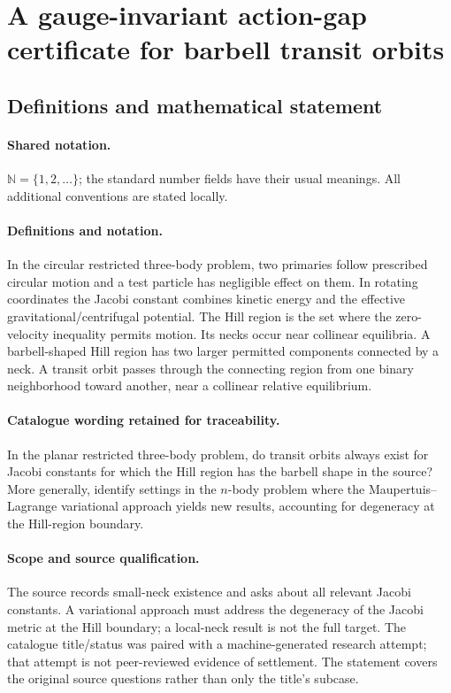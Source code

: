 \documentclass[11pt]{article}
\begin{document}
\section{A gauge-invariant action-gap certificate for barbell transit orbits}\label{statement}

\subsection{Definitions and mathematical statement}

\paragraph{Shared notation.}$\mathbb N=\{1,2,\ldots\}$; the standard number fields have their usual meanings. All additional conventions are stated locally.


\paragraph{Definitions and notation.}In the circular restricted three-body problem, two primaries follow prescribed circular motion and a test particle has negligible effect on them. In rotating coordinates the Jacobi constant combines kinetic energy and the effective gravitational/centrifugal potential. The Hill region is the set where the zero-velocity inequality permits motion. Its necks occur near collinear equilibria. A barbell-shaped Hill region has two larger permitted components connected by a neck. A transit orbit passes through the connecting region from one binary neighborhood toward another, near a collinear relative equilibrium.

\paragraph{Catalogue wording retained for traceability.}
In the planar restricted three-body problem, do transit orbits always exist for Jacobi constants for which the Hill region has the barbell shape in the source? More generally, identify settings in the $n$-body problem where the Maupertuis--Lagrange variational approach yields new results, accounting for degeneracy at the Hill-region boundary.
\paragraph{Scope and source qualification.}The source records small-neck existence and asks about all relevant Jacobi constants. A variational approach must address the degeneracy of the Jacobi metric at the Hill boundary; a local-neck result is not the full target. The catalogue title/status was paired with a machine-generated research attempt; that attempt is not peer-reviewed evidence of settlement. The statement covers the original source questions rather than only the title’s subcase.
\end{document}
